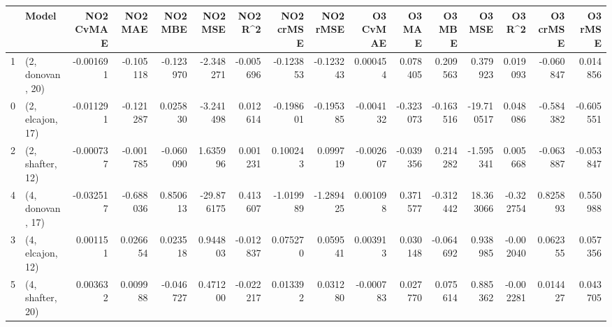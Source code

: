 \begin{tabular}{llrrrrrrrrrrrrrr}
\toprule
{} &             Model &  NO2 CvMAE &   NO2 MAE &   NO2 MBE &    NO2 MSE &   NO2 R\textasciicircum2 &  NO2 crMSE &  NO2 rMSE &  O3 CvMAE &    O3 MAE &    O3 MBE &     O3 MSE &    O3 R\textasciicircum2 &  O3 crMSE &   O3 rMSE \\
\midrule
1 &  (2, donovan, 20) &  -0.001691 & -0.105118 & -0.123970 &  -2.348271 & -0.005696 &  -0.123853 & -0.123243 &  0.000454 &  0.078405 &  0.209563 &   0.379923 &  0.019093 & -0.060847 &  0.014856 \\
0 &  (2, elcajon, 17) &  -0.011291 & -0.121287 &  0.025830 &  -3.241498 &  0.012614 &  -0.198601 & -0.195385 & -0.004132 & -0.323073 & -0.163516 & -19.710517 &  0.048086 & -0.584382 & -0.605551 \\
2 &  (2, shafter, 12) &  -0.000737 & -0.001785 & -0.060090 &   1.635996 &  0.001231 &   0.100243 &  0.099719 & -0.002607 & -0.039356 &  0.214282 &  -1.595341 &  0.005668 & -0.063887 & -0.053847 \\
4 &  (4, donovan, 17) &  -0.032517 & -0.688036 &  0.850613 & -29.876175 &  0.413607 &  -1.019989 & -1.289425 &  0.001098 &  0.371577 & -0.312442 &  18.363066 & -0.322754 &  0.825893 &  0.550988 \\
3 &  (4, elcajon, 12) &   0.001151 &  0.026654 &  0.023518 &   0.944803 & -0.012837 &   0.075270 &  0.059541 &  0.003913 &  0.030148 & -0.064692 &   0.938985 & -0.002040 &  0.062355 &  0.057356 \\
5 &  (4, shafter, 20) &   0.003632 &  0.009988 & -0.046727 &   0.471200 & -0.022217 &   0.013392 &  0.031280 & -0.000783 &  0.027770 &  0.075614 &   0.885362 & -0.002281 &  0.014427 &  0.043705 \\
\bottomrule
\end{tabular}
